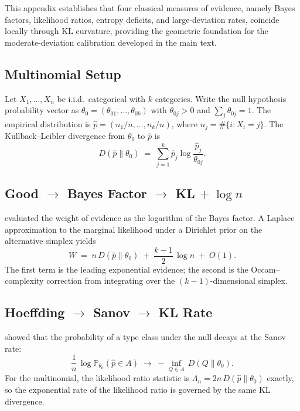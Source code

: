 \documentclass[11pt]{article}
\newcommand{\1}{\mathbf{1}}
\newcommand{\PP}{\mathbb{P}}
\theoremstyle{plain}
\theoremstyle{definition}
\theoremstyle{remark}
\begin{document}
This appendix establishes that four classical measures of evidence, namely Bayes factors, likelihood ratios, entropy deficits, and large-deviation rates, coincide locally through KL curvature, providing the geometric foundation for the moderate-deviation calibration developed in the main text.


\subsection{Multinomial Setup}\label{app:tri-setup}

Let $X_1,\ldots,X_n$ be i.i.d.\ categorical with $k$ categories.
Write the null hypothesis probability vector as $\theta_0=(\theta_{01},\ldots,\theta_{0k})$ with $\theta_{0j}>0$ and $\sum_j\theta_{0j}=1$.
The empirical distribution is $\hat{p}=(n_1/n,\ldots,n_k/n)$, where $n_j=\#\{i:X_i=j\}$.
The Kullback--Leibler divergence from $\theta_0$ to $\hat{p}$ is
\begin{equation}\label{eq:tri-kl}
D(\hat{p}\|\theta_0) \;=\; \sum_{j=1}^{k} \hat{p}_j \log\frac{\hat{p}_j}{\theta_{0j}}.
\end{equation}


\subsection{\texorpdfstring{Good $\to$ Bayes Factor $\to$ KL $+\; \log n$}{Good to Bayes Factor to KL + log n}}\label{app:tri-good}

\citet{Good1955} evaluated the weight of evidence as the logarithm of the Bayes factor.
A Laplace approximation to the marginal likelihood under a Dirichlet prior on the alternative simplex yields
\begin{equation}\label{eq:tri-good}
W \;=\; n\,D(\hat{p}\|\theta_0) \;+\; \frac{k-1}{2}\,\log n \;+\; O(1).
\end{equation}
The first term is the leading exponential evidence; the second is the Occam--complexity correction from integrating over the $(k{-}1)$-dimensional simplex.


\subsection{\texorpdfstring{Hoeffding $\to$ Sanov $\to$ KL Rate}{Hoeffding to Sanov to KL Rate}}\label{app:tri-hoeffding}

\citet{Hoeffding1965} showed that the probability of a type class under the null decays at the Sanov rate:
\begin{equation}\label{eq:tri-sanov}
\frac{1}{n}\,\log \PP_{\theta_0}(\hat{p}\in A) \;\to\; -\inf_{Q\in A}\,D(Q\|\theta_0).
\end{equation}
For the multinomial, the likelihood ratio statistic is $\Lambda_n = 2n\,D(\hat{p}\|\theta_0)$ exactly, so the exponential rate of the likelihood ratio is governed by the same KL divergence.
\end{document}
